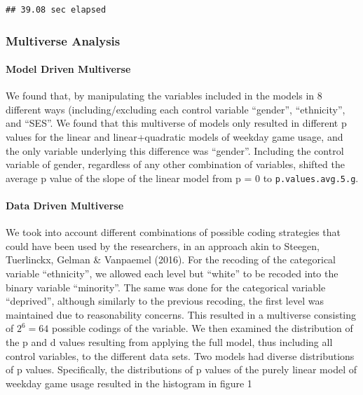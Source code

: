 \documentclass[floatsintext,man]{apa6}
\theoremstyle{definition}
\theoremstyle{definition}
\theoremstyle{definition}
\theoremstyle{remark}
\begin{document}
\begin{verbatim}
## 39.08 sec elapsed
\end{verbatim}

\hypertarget{multiverse-analysis}{%
\subsubsection{Multiverse Analysis}\label{multiverse-analysis}}

\hypertarget{model-driven-multiverse}{%
\paragraph{Model Driven Multiverse}\label{model-driven-multiverse}}

We found that, by manipulating the variables included in the models in 8
different ways (including/excluding each control variable
\enquote{gender}, \enquote{ethnicity}, and \enquote{SES}. We found that
this multiverse of models only resulted in different p values for the
linear and linear+quadratic models of weekday game usage, and the only
variable underlying this difference was \enquote{gender}. Including the
control variable of gender, regardless of any other combination of
variables, shifted the average p value of the slope of the linear model
from p = 0 to \texttt{p.values.avg.5.g}.

\hypertarget{data-driven-multiverse}{%
\paragraph{Data Driven Multiverse}\label{data-driven-multiverse}}

We took into account different combinations of possible coding
strategies that could have been used by the researchers, in an approach
akin to Steegen, Tuerlinckx, Gelman \& Vanpaemel (2016). For the
recoding of the categorical variable \enquote{ethnicity}, we allowed
each level but \enquote{white} to be recoded into the binary variable
\enquote{minority}. The same was done for the categorical variable
\enquote{deprived}, although similarly to the previous recoding, the
first level was maintained due to reasonability concerns. This resulted
in a multiverse consisting of \(2^6 = 64\) possible codings of the
variable. We then examined the distribution of the p and d values
resulting from applying the full model, thus including all control
variables, to the different data sets. Two models had diverse
distributions of p values. Specifically, the distributions of p values
of the purely linear model of weekday game usage resulted in the
histogram in figure 1
\end{document}
